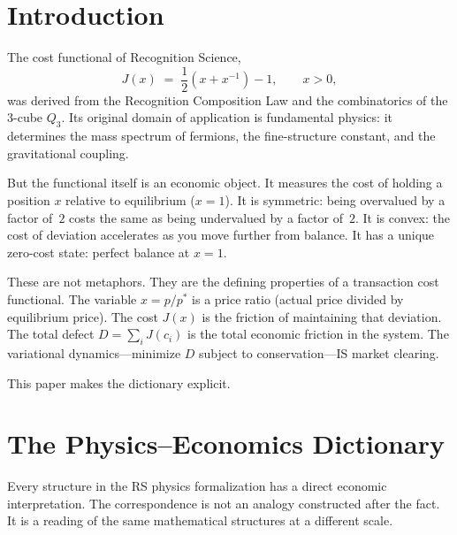 \documentclass[11pt,a4paper]{article}
\theoremstyle{plain}
\theoremstyle{definition}
\theoremstyle{remark}
\newcommand{\Jcost}{J}
\begin{document}
\tableofcontents
\newpage

\section{Introduction}\label{sec:intro}

The cost functional of Recognition Science,
\begin{equation}\label{eq:jcost}
\Jcost(x) \;=\; \frac{1}{2}\!\left(x + x^{-1}\right) - 1, \qquad x > 0,
\end{equation}
was derived from the Recognition Composition Law and the combinatorics of the $3$-cube $Q_3$.
Its original domain of application is fundamental physics: it determines the mass spectrum of fermions, the fine-structure constant, and the gravitational coupling.

But the functional itself is an economic object.
It measures the cost of holding a position $x$ relative to equilibrium ($x=1$).
It is symmetric: being overvalued by a factor of~$2$ costs the same as being undervalued by a factor of~$2$.
It is convex: the cost of deviation accelerates as you move further from balance.
It has a unique zero-cost state: perfect balance at $x=1$.

These are not metaphors.
They are the defining properties of a transaction cost functional.
The variable $x = p/p^*$ is a price ratio (actual price divided by equilibrium price).
The cost $\Jcost(x)$ is the friction of maintaining that deviation.
The total defect $D = \sum_i \Jcost(c_i)$ is the total economic friction in the system.
The variational dynamics---minimize $D$ subject to conservation---IS market clearing.

This paper makes the dictionary explicit.

\section{The Physics--Economics Dictionary}\label{sec:dictionary}

Every structure in the RS physics formalization has a direct economic interpretation.
The correspondence is not an analogy constructed after the fact.
It is a reading of the same mathematical structures at a different scale.
\end{document}
